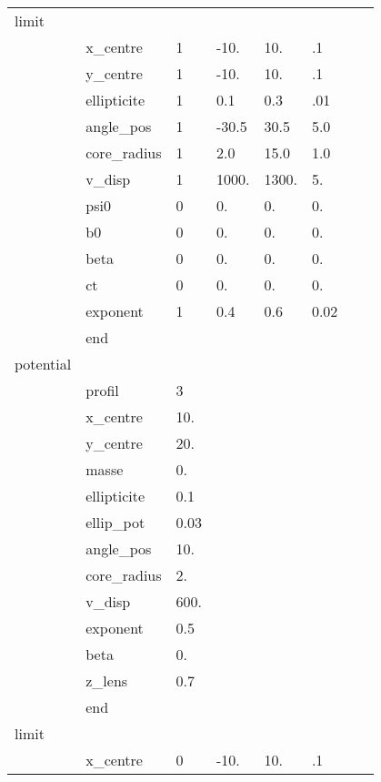 \vfill\eject
{\bf
\begin{tabular}{llllllll}
limit& & & & & & & \\
        &x\_centre    &   1 &    -10.   &   10.  &    .1 & & \\
        &y\_centre    &   1 &    -10.   &   10.  &    .1 & & \\ 
        &ellipticite &   1 &      0.1  &    0.3 &    .01 & & \\
        &angle\_pos   &   1 &    -30.5  &   30.5 &   5.0 & & \\
        &core\_radius &   1 &      2.0  &   15.0 &   1.0 & & \\
        &v\_disp      &   1 &   1000.   & 1300.  & 5. & & \\
        &psi0        &   0 &      0.   &    0.  &   0. & & \\
        &b0          &   0 &      0.   &    0.  &   0. & & \\
        &beta        &   0 &      0.   &    0.  &   0.& & \\
        &ct          &   0 &      0.   &    0.  &   0. & & \\
        &exponent    &   1 &      0.4  &    0.6 &   0.02 & & \\
        &end& & & & & &  \\
potential& & & & & & & \\
        &profil      &   3 & & & & & \\
        &x\_centre    &   10. & & & & & \\
        &y\_centre    &   20. & & & & & \\
        &masse       &   0. & & & & & \\
        &ellipticite &   0.1 & & & & & \\
        &ellip\_pot   &   0.03 & & & & & \\
        &angle\_pos   &   10. & & & & & \\
        &core\_radius &   2. & & & & & \\
        &v\_disp      &   600. & & & & & \\
        &exponent    &   0.5  & & & & & \\
        &beta        &   0. & & & & & \\
        &z\_lens      &   0.7 & & & & & \\
        &end& & & & & &  \\
limit& & & & & & & \\
        &x\_centre      & 0 &    -10.  &    10.  &    .1  & & \\

\end{tabular}}
